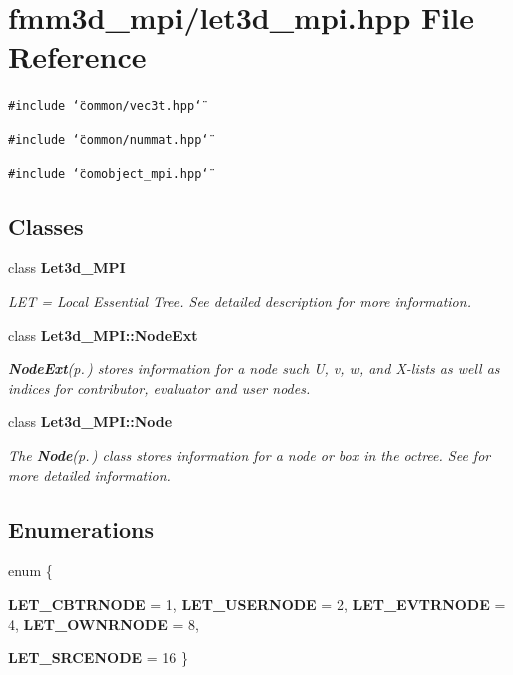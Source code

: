 \section{fmm3d\_\-mpi/let3d\_\-mpi.hpp File Reference}
\label{let3d__mpi_8hpp}


{\tt \#include \char`\"{}common/vec3t.hpp\char`\"{}}\par
{\tt \#include \char`\"{}common/nummat.hpp\char`\"{}}\par
{\tt \#include \char`\"{}comobject\_\-mpi.hpp\char`\"{}}\par
\subsection*{Classes}
\begin{CompactItemize}
\item 
class {\bf Let3d\_\-MPI}
\begin{CompactList}\small\item\em LET = Local Essential Tree. See detailed description for more information. \item\end{CompactList}\item 
class {\bf Let3d\_\-MPI::Node\-Ext}
\begin{CompactList}\small\item\em {\bf Node\-Ext}{\rm (p.\,\pageref{classLet3d__MPI_1_1NodeExt})} stores information for a node such U, v, w, and X-lists as well as indices for contributor, evaluator and user nodes. \item\end{CompactList}\item 
class {\bf Let3d\_\-MPI::Node}
\begin{CompactList}\small\item\em The {\bf Node}{\rm (p.\,\pageref{classLet3d__MPI_1_1Node})} class stores information for a node or box in the octree. See for more detailed information. \item\end{CompactList}\end{CompactItemize}
\subsection*{Enumerations}
\begin{CompactItemize}
\item 
enum \{ \par
{\bf LET\_\-CBTRNODE} =  1, 
{\bf LET\_\-USERNODE} =  2, 
{\bf LET\_\-EVTRNODE} =  4, 
{\bf LET\_\-OWNRNODE} =  8, 
\par
{\bf LET\_\-SRCENODE} =  16
 \}
\end{CompactItemize}


